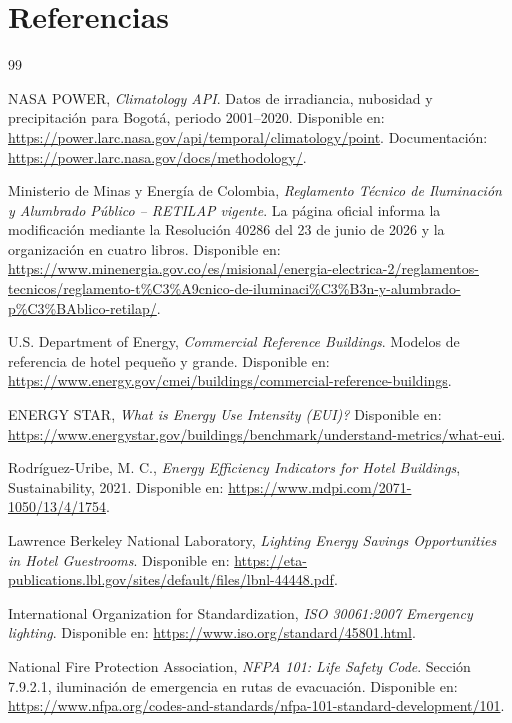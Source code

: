 \documentclass[12pt,a4paper]{article}
\begin{document}
\section*{Referencias}
\begin{thebibliography}{99}

NASA POWER, \textit{Climatology API}. Datos de irradiancia, nubosidad y precipitación para Bogotá, periodo 2001--2020. Disponible en: \url{https://power.larc.nasa.gov/api/temporal/climatology/point}. Documentación: \url{https://power.larc.nasa.gov/docs/methodology/}.

Ministerio de Minas y Energía de Colombia, \textit{Reglamento Técnico de Iluminación y Alumbrado Público -- RETILAP vigente}. La página oficial informa la modificación mediante la Resolución 40286 del 23 de junio de 2026 y la organización en cuatro libros. Disponible en: \url{https://www.minenergia.gov.co/es/misional/energia-electrica-2/reglamentos-tecnicos/reglamento-t%C3%A9cnico-de-iluminaci%C3%B3n-y-alumbrado-p%C3%BAblico-retilap/}.

U.S. Department of Energy, \textit{Commercial Reference Buildings}. Modelos de referencia de hotel pequeño y grande. Disponible en: \url{https://www.energy.gov/cmei/buildings/commercial-reference-buildings}.

ENERGY STAR, \textit{What is Energy Use Intensity (EUI)?} Disponible en: \url{https://www.energystar.gov/buildings/benchmark/understand-metrics/what-eui}.

Rodríguez-Uribe, M. C., \textit{Energy Efficiency Indicators for Hotel Buildings}, Sustainability, 2021. Disponible en: \url{https://www.mdpi.com/2071-1050/13/4/1754}.

Lawrence Berkeley National Laboratory, \textit{Lighting Energy Savings Opportunities in Hotel Guestrooms}. Disponible en: \url{https://eta-publications.lbl.gov/sites/default/files/lbnl-44448.pdf}.

International Organization for Standardization, \textit{ISO 30061:2007 Emergency lighting}. Disponible en: \url{https://www.iso.org/standard/45801.html}.

National Fire Protection Association, \textit{NFPA 101: Life Safety Code}. Sección 7.9.2.1, iluminación de emergencia en rutas de evacuación. Disponible en: \url{https://www.nfpa.org/codes-and-standards/nfpa-101-standard-development/101}.


\end{thebibliography}
\end{document}

